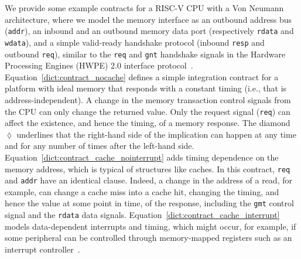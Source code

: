 We provide some example contracts for a RISC-V CPU with a Von Neumann architecture, where we model the memory interface as an outbound address bus (\texttt{addr}), an inbound and an outbound memory data port (respectively \texttt{rdata} and \texttt{wdata}), and a simple valid-ready handshake protocol (inbound \texttt{resp} and outbound \texttt{req}), similar to the \texttt{req} and \texttt{gnt} handshake signals in the Hardware Processing Engines (HWPE) 2.0 interface protocol~\cite{pulpHWPEMem}.
Equation~\ref{dict:contract_nocache} defines a simple integration contract for a platform with ideal memory that responds with a constant timing (i.e., that is address-independent).
A change in the memory transaction control signals from the CPU can only change the returned value.
Only the request signal (\texttt{req}) can affect the existence, and hence the timing, of a memory response.
The diamond $\lozenge$ underlines that the right-hand side of the implication can happen at any time and for any number of times after the left-hand side.
Equation~\ref{dict:contract_cache_nointerrupt} adds timing dependence on the memory address, which is typical of structures like caches.
In this contract, \texttt{req} and \texttt{addr} have an identical clause. Indeed, a change in the address of a read, for example, can change a cache miss into a cache hit, changing the timing, and hence the value at some point in time, of the response, including the \texttt{gmt} control signal and the \texttt{rdata} data signals.
Equation~\ref{dict:contract_cache_interrupt} models data-dependent interrupts and timing, which might occur, for example, if some peripheral can be controlled through memory-mapped registers such as an interrupt controller~\cite{riscv_plic_spec_1_0_0}.

